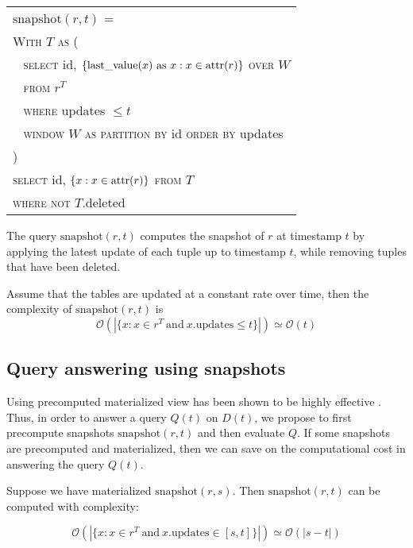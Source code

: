 {\small
\begin{tabular}{|l|} \hline
    $\mathrm{snapshot}(r, t)$ = \\
    \verb|| \textsc{With} $T$ \textsc{as} ( \\
    \verb| | \textsc{select} id, $\{\mathrm{last\_value}(x) \mathrm{\ as\ } x:
    x\in\mathrm{attr}(r)\}$ \textsc{over} $W$ \\
    \verb| | \textsc{from} $r^T$ \\
    \verb| | \textsc{where} updates $\leq t$ \\
    \verb| | \textsc{window} $W$ \textsc{as} 
             \textsc{partition by} id \textsc{order by} updates\\
    \verb|| ) \\
    \verb|| \textsc{select} id, $\{x: x\in\mathrm{attr}(r)\}$ \textsc{from} $T$ \\
    \verb|| \textsc{where not} $T.$deleted \\ \hline
\end{tabular}
}

\vspace{1em}

The query $\mathrm{snapshot}(r, t)$ computes the snapshot of $r$ at timestamp
$t$ by applying the latest update of each tuple up to timestamp $t$, while
removing tuples that have been deleted.

\begin{prop}
    \label{prop:linear-time}
    Assume that the tables are updated at a constant rate over time,
    then the complexity of $\mathrm{snapshot}(r, t)$ is 
    $$\mathcal{O}(|\{x: x\in r^T\mathrm{\ and\ } x.\mathrm{updates} \leq t\}|)
    \simeq \mathcal{O}(t)$$
\end{prop}

\subsection{Query answering using snapshots}

Using precomputed materialized view has been shown to be highly effective \cite{sohrabi2016materialized,du2017deepsea}.
Thus, in order to answer a query $Q(t)$ on $D(t)$, we propose to first precompute
snapshots $\mathrm{snapshot}(r, t)$ and then evaluate $Q$.  If some snapshots
are precomputed and materialized, then we can save on the computational cost in
answering the query $Q(t)$.

\begin{prop}
    Suppose we have materialized $\mathrm{snapshot}(r, s)$.  Then
    $\mathrm{snapshot}(r, t)$ can be computed with complexity:

    $$\mathcal{O}(|\{x: x\in r^T\mathrm{\ and\ } x.\mathrm{updates} \in [s,
    t]\}|) \simeq \mathcal{O}(|s-t|)$$
\end{prop}


